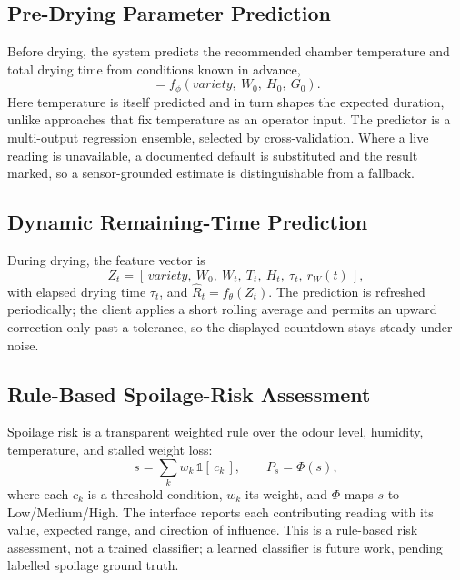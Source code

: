 \documentclass[conference]{IEEEtran}
\begin{document}
\subsection{Pre-Drying Parameter Prediction}
Before drying, the system predicts the recommended chamber temperature and
total drying time from conditions known in advance,
\begin{equation}
[\,\hat{\theta},\ \hat{R}_{0}\,] = f_{\phi}(\textit{variety},\ W_{0},\
H_{0},\ G_{0}).\label{eq6}
\end{equation}
Here temperature is itself predicted and in turn shapes the expected
duration, unlike approaches that fix temperature as an operator input. The
predictor is a multi-output regression ensemble, selected by
cross-validation. Where a live reading is unavailable, a documented default
is substituted and the result marked, so a sensor-grounded estimate is
distinguishable from a fallback.

\subsection{Dynamic Remaining-Time Prediction}
During drying, the feature vector is
\begin{equation}
Z_{t} = [\,\textit{variety},\ W_{0},\ W_{t},\ T_{t},\ H_{t},\ \tau_{t},\
r_{W}(t)\,],\label{eq7}
\end{equation}
with elapsed drying time $\tau_{t}$, and $\hat{R}_{t}=f_{\theta}(Z_{t})$.
The prediction is refreshed periodically; the client applies a short
rolling average and permits an upward correction only past a tolerance, so
the displayed countdown stays steady under noise.

\subsection{Rule-Based Spoilage-Risk Assessment}
Spoilage risk is a transparent weighted rule over the odour level,
humidity, temperature, and stalled weight loss:
\begin{equation}
s = \sum_{k} w_{k}\,\mathbb{1}[\,c_{k}\,],\qquad
P_{s} = \Phi(s),\label{eq8}
\end{equation}
where each $c_{k}$ is a threshold condition, $w_{k}$ its weight, and
$\Phi$ maps $s$ to Low/Medium/High. The interface reports each contributing
reading with its value, expected range, and direction of influence. This
is a rule-based risk assessment, not a trained classifier; a learned
classifier is future work, pending labelled spoilage ground truth.
\end{document}

